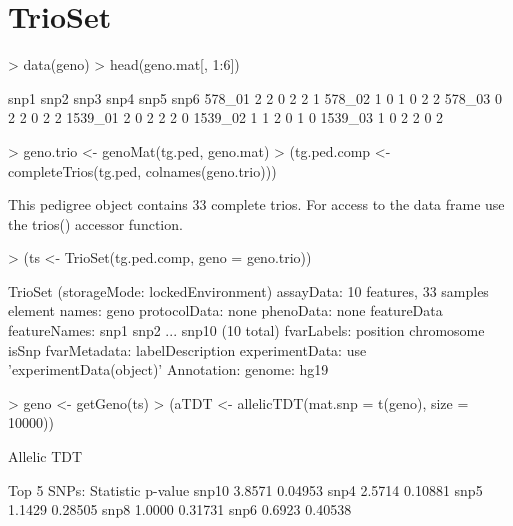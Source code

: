 \documentclass[10pt]{article}
\begin{document}
\section{TrioSet}
\begin{Schunk}
\begin{Sinput}
> data(geno)
> head(geno.mat[, 1:6])
\end{Sinput}
\begin{Soutput}
        snp1 snp2 snp3 snp4 snp5 snp6
578_01     2    2    0    2    2    1
578_02     1    0    1    0    2    2
578_03     0    2    2    0    2    2
1539_01    2    0    2    2    2    0
1539_02    1    1    2    0    1    0
1539_03    1    0    2    2    0    2
\end{Soutput}
\begin{Sinput}
> geno.trio <- genoMat(tg.ped, geno.mat)
> (tg.ped.comp <- completeTrios(tg.ped, colnames(geno.trio)))
\end{Sinput}
\begin{Soutput}
This pedigree object contains 33 complete trios.
For access to the data frame use the trios() accessor function.
\end{Soutput}
\begin{Sinput}
> (ts <- TrioSet(tg.ped.comp, geno = geno.trio))
\end{Sinput}
\begin{Soutput}
TrioSet (storageMode: lockedEnvironment)
assayData: 10 features, 33 samples 
  element names: geno 
protocolData: none
phenoData: none
featureData
  featureNames: snp1 snp2 ... snp10 (10 total)
  fvarLabels: position chromosome isSnp
  fvarMetadata: labelDescription
experimentData: use 'experimentData(object)'
Annotation:  
genome:  hg19 
\end{Soutput}
\end{Schunk}
\begin{Schunk}
\begin{Sinput}
> geno <- getGeno(ts)
> (aTDT <- allelicTDT(mat.snp = t(geno), size = 10000))
\end{Sinput}
\begin{Soutput}
      Allelic TDT

Top 5 SNPs:
      Statistic p-value
snp10    3.8571 0.04953
snp4     2.5714 0.10881
snp5     1.1429 0.28505
snp8     1.0000 0.31731
snp6     0.6923 0.40538
\end{Soutput}
\end{Schunk}
\end{document}
